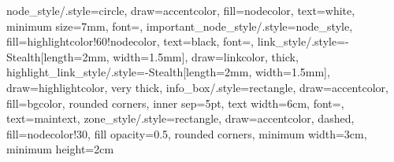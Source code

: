 {    %
    node_style/.style={circle, draw=accentcolor, fill=nodecolor, text=white, minimum size=7mm, font=\sffamily\small},
    important_node_style/.style={node_style, fill=highlightcolor!60!nodecolor, text=black, font=\sffamily\small\bfseries},
    link_style/.style={-{Stealth[length=2mm, width=1.5mm]}, draw=linkcolor, thick},
    highlight_link_style/.style={-{Stealth[length=2mm, width=1.5mm]}, draw=highlightcolor, very thick},
    info_box/.style={rectangle, draw=accentcolor, fill=bgcolor, rounded corners, inner sep=5pt, text width=6cm, font=\sffamily\footnotesize, text=maintext},
    zone_style/.style={rectangle, draw=accentcolor, dashed, fill=nodecolor!30, fill opacity=0.5, rounded corners, minimum width=3cm, minimum height=2cm}
}

\usepackage{array}
\usepackage{booktabs}
\usepackage{longtable}

\usepackage{siunitx} %

\usepackage{hyperref}

\usepackage{graphicx}

\usepackage{xcolor}

\hypersetup{
    colorlinks=true,
    linkcolor=white,
    filecolor=magenta,
    urlcolor=cyan,
    citecolor=green,
    pdfpagemode=FullScreen,
    bookmarksopen=true,
    bookmarksnumbered=true
}

\usepackage[
  type={CC},
  modifier={by-sa},
  version={4.0},
]{doclicense}

\usepackage{xcolor}
\pagecolor{black}
\color{white}

\usepackage{minted}
